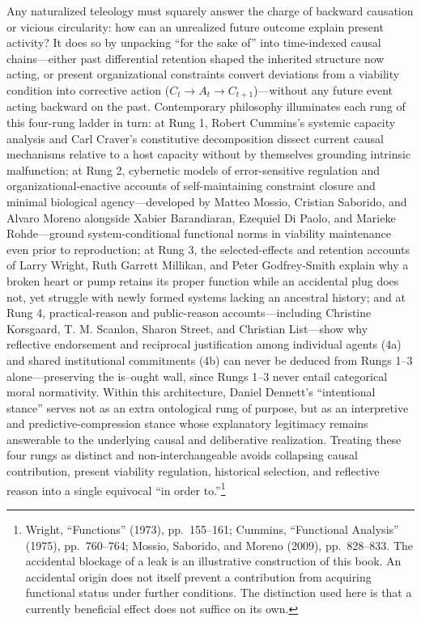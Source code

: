 \documentclass[
  english,
  11pt,
  oneside]{book}
\begin{document}
Any naturalized teleology must squarely answer the charge of backward causation or vicious circularity: how can an unrealized future outcome explain present activity? It does so by unpacking ``for the sake of'' into time-indexed causal chains---either past differential retention shaped the inherited structure now acting, or present organizational constraints convert deviations from a viability condition into corrective action (\(C_t\to A_t\to C_{t+1}\))---without any future event acting backward on the past. Contemporary philosophy illuminates each rung of this four-rung ladder in turn: at Rung 1, Robert Cummins's systemic capacity analysis and Carl Craver's constitutive decomposition dissect current causal mechanisms relative to a host capacity without by themselves grounding intrinsic malfunction; at Rung 2, cybernetic models of error-sensitive regulation and organizational-enactive accounts of self-maintaining constraint closure and minimal biological agency---developed by Matteo Mossio, Cristian Saborido, and Alvaro Moreno alongside Xabier Barandiaran, Ezequiel Di Paolo, and Marieke Rohde---ground system-conditional functional norms in viability maintenance even prior to reproduction; at Rung 3, the selected-effects and retention accounts of Larry Wright, Ruth Garrett Millikan, and Peter Godfrey-Smith explain why a broken heart or pump retains its proper function while an accidental plug does not, yet struggle with newly formed systems lacking an ancestral history; and at Rung 4, practical-reason and public-reason accounts---including Christine Korsgaard, T. M. Scanlon, Sharon Street, and Christian List---show why reflective endorsement and reciprocal justification among individual agents (4a) and shared institutional commitments (4b) can never be deduced from Rungs 1--3 alone---preserving the is--ought wall, since Rungs 1--3 never entail categorical moral normativity. Within this architecture, Daniel Dennett's ``intentional stance'' serves not as an extra ontological rung of purpose, but as an interpretive and predictive-compression stance whose explanatory legitimacy remains answerable to the underlying causal and deliberative realization. Treating these four rungs as distinct and non-interchangeable avoids collapsing causal contribution, present viability regulation, historical selection, and reflective reason into a single equivocal ``in order to.''\footnote{\hypertarget{ph-note-28}{}Wright, ``Functions'' (1973), pp.~155--161; Cummins, ``Functional Analysis'' (1975), pp.~760--764; Mossio, Saborido, and Moreno (2009), pp.~828--833. The accidental blockage of a leak is an illustrative construction of this book. An accidental origin does not itself prevent a contribution from acquiring functional status under further conditions. The distinction used here is that a currently beneficial effect does not suffice on its own.}
\end{document}
